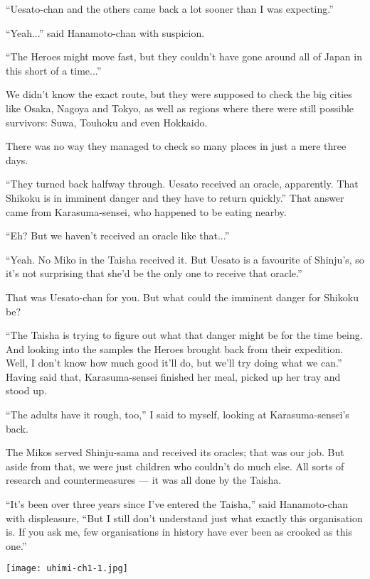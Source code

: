 ``Uesato-chan and the others came back a lot sooner than I was expecting.''

``Yeah...'' said Hanamoto-chan with suspicion.

``The Heroes might move fast, but they couldn't have gone around all of Japan in this short of a time...''

We didn't know the exact route, but they were supposed to check the big cities like Osaka, Nagoya and Tokyo, as well as regions where there were still possible survivors: Suwa, Touhoku and even Hokkaido.

There was no way they managed to check so many places in just a mere three days.

``They turned back halfway through. Uesato received an oracle, apparently. That Shikoku is in imminent danger and they have to return quickly.''  That answer came from Karasuma-sensei, who happened to be eating nearby.

``Eh? But we haven't received an oracle like that...''

``Yeah. No Miko in the Taisha received it. But Uesato is a favourite of Shinju's, so it's not surprising that she'd be the only one to receive that oracle.''

That was Uesato-chan for you. But what could the imminent danger for Shikoku be?

``The Taisha is trying to figure out what that danger might be for the time being. And looking into the samples the Heroes brought back from their expedition. Well, I don't know how much good it'll do, but we'll try doing what we can.''  Having said that, Karasuma-sensei finished her meal, picked up her tray and stood up.

``The adults have it rough, too,'' I said to myself, looking at Karasuma-sensei's back.

The Mikos served Shinju-sama and received its oracles; that was our job. But aside from that, we were just children who couldn't do much else. All sorts of research and countermeasures --- it was all done by the Taisha.

``It's been over three years since I've entered the Taisha,'' said Hanamoto-chan with displeasure, ``But I still don't understand just what exactly this organisation is. If you ask me, few organisations in history have ever been as crooked as this one.''

\newpage
\thispagestyle{empty}
\texttt{[image: uhimi-ch1-1.jpg]}

